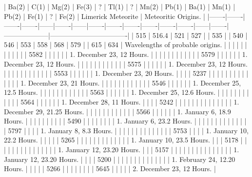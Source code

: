 \documentclass[a4paper, 12pt, oneside, polutonikogreek, english]{article}
\begin{document}
\clearpage
| Ba(2) | C(1) | Mg(2) | Fe(3) | ?  | Tl(1) | ?  | Mn(2) | Pb(1) | Ba(1) | Mn(1) | Pb(2) | Fe(1) | ?  | Fe(2) | Limerick Meteorite | Meteoritic Origins.       |
|-------|-------|-------|-------|------|-------|------|-------|-------|-------|-------|-------|-------|------|-------|--------------------|----------------------------------|
| 515  | 516.4 | 521  | 527  |   | 535  |   | 540  | 546  | 553  | 558  | 568  | 579  |   | 615  | 634        | Wavelengths of probable origins. |
|    |    |    |    |   |    |   |    |    |    | 5582 |    |    |   |    |          | 1. December 23, 12 Hours.    |
|    |    |    |    |   |    |   |    |    |    | 5579 |    |    |   |    |          | 1. December 23, 12 Hours.    |
|    |    |    |    |   |    |   |    |    |    | 5575 |    |    |   |    |          | 1. December 23, 12 Hours.    |
|    |    |    |    |   |    |   |    |    |    | 5553 |    |    |   |    |          | 1. December 23, 20 Hours.    |
|    |    | 5237 |    |   |    |   |    |    |    |    |    |    |   |    |          | 1. December 23, 21 Hours.    |
|    |    |    |    |   |    |   |    |    |    | 5546 |    |    |   |    |          | 1. December 25, 12.5 Hours.   |
|    |    |    |    |   |    |   |    |    |    | 5563 |    |    |   |    |          | 1. December 25, 12.6 Hours.   |
|    |    |    |    |   |    |   |    |    |    | 5564 |    |    |   |    |          | 1. December 28, 11 Hours.    |
|    |    | 5242 |    |   |    |   |    |    |    |    |    |    |   |    |          | 1. December 29, 21.25 Hours.   |
|    |    |    |    |   |    |   |    |    |    | 5566 |    |    |   |    |          | 1. January 6, 18.9 Hours.    |
|    |    |    |    |   |    |   |    | 5490 |    |    |    |    |   |    |          | 1. January 6, 23.2 Hours.    |
|    |    |    |    |   |    |   |    |    |    |    |    | 5797 |   |    |          | 1. January 8, 8.3 Hours.     |
|    |    |    |    |   |    |   |    |    |    |    |    | 5753 |   |    |          | 1. January 10, 22.2 Hours.    |
|    |    |    | 5265 |   |    |   |    |    |    |    |    |    |   |    |          | 1. January 10, 23.5 Hours.    |
|    | 5178 |    |    |   |    |   |    |    |    |    |    |    |   |    |          | 1. January 12, 23.20 Hours.   |
|    | 5157 |    |    |   |    |   |    |    |    |    |    |    |   |    |          | 1. January 12, 23.20 Hours.   |
|    |    | 5200 |    |   |    |   |    |    |    |    |    |    |   |    |          | 1. February 24, 12.20 Hours.   |
|    |    |    | 5266 |   |    |   |    |    |    |    | 5645 |    |   |    |          | 2. December 23, 12 Hours.    |
\end{document}
